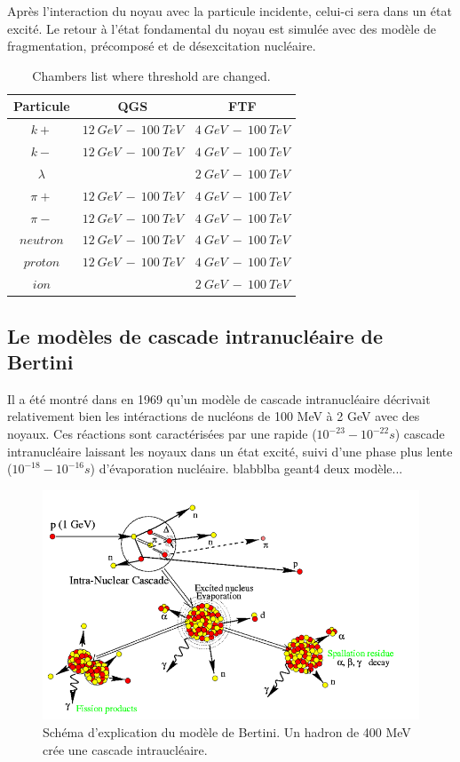 Après l'interaction du noyau avec la particule incidente, celui-ci sera dans un état excité. Le retour à l'état fondamental du noyau est simulée avec des modèle de fragmentation, précomposé et de désexcitation nucléaire.
\begin{table}[!ht]
  \begin{center}
    \begin{tabular}{c|c|c}
      Particule & QGS & FTF\\
      \hline
      $k+$ & $12\ GeV\ -\ 100\ TeV$ & $4\ GeV\ -\ 100\ TeV$\\
      $k-$ & $12\ GeV\ -\ 100\ TeV$ & $4\ GeV\ -\ 100\ TeV$\\
      $\lambda$ & $ $ & $2\ GeV\ -\ 100\ TeV$\\
      $\pi+$ & $12\ GeV\ -\ 100\ TeV$ & $4\ GeV\ -\ 100\ TeV$\\
      $\pi-$ & $12\ GeV\ -\ 100\ TeV$ & $4\ GeV\ -\ 100\ TeV$\\
      $neutron$ & $12\ GeV\ -\ 100\ TeV$ & $4\ GeV\ -\ 100\ TeV$\\
      $proton$ & $12\ GeV\ -\ 100\ TeV$ & $4\ GeV\ -\ 100\ TeV$\\
      $ion$ & $ $ & $2\ GeV\ -\ 100\ TeV$\\
    \end{tabular}
  \end{center}
  \caption{Chambers list where threshold are changed.}
  \label{tab.partonModelTable}
\end{table}
\subsection{Le modèles de cascade intranucléaire de Bertini}
\label{sec.inucl}
Il a été montré dans \cite{bertini} en 1969 qu'un modèle de cascade intranucléaire décrivait relativement bien les intéractions de nucléons de 100 MeV à 2 GeV avec des noyaux. Ces réactions sont caractérisées par une rapide ($10^{-23}-10^{-22} s$) cascade intranucléaire laissant les noyaux dans un état excité, suivi d'une phase plus lente ($10^{-18}-10^{-16} s$) d'évaporation nucléaire. blabblba geant4 deux modèle...
\begin{figure}[!ht]
  \begin{center}
    \includegraphics[width=.8\textwidth]{Digitizer/figs/intraNucl.png}
    \caption{Schéma d'explication du modèle de Bertini. Un hadron de 400 MeV crée une cascade intraucléaire.}
    \label{fig.g4bertini}
  \end{center}
\end{figure}

